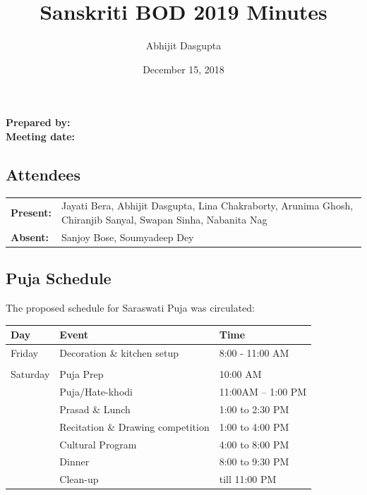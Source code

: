 \documentclass[12pt,]{article}
\title{Sanskriti BOD 2019 Minutes}
\author{Abhijit Dasgupta}
\date{December 15, 2018}
\makeatletter
\renewcommand{\maketitle}{\bgroup\setlength{\parindent}{0pt}
\begin{flushleft}
  \textbf{Prepared by:} \@author\\
  \textbf{Meeting date:} \@date
\end{flushleft}\egroup
}
\makeatother
\begin{document}
\maketitle

\thispagestyle{style1}

{
\setcounter{tocdepth}{4}
\tableofcontents
}
\hypertarget{attendees}{%
\subsection{Attendees}\label{attendees}}

\begin{longtable}[]{@{}ll@{}}
\toprule
\endhead
\begin{minipage}[t]{0.09\columnwidth}\raggedright
\textbf{Present:}\strut
\end{minipage} & \begin{minipage}[t]{0.85\columnwidth}\raggedright
Jayati Bera, Abhijit Dasgupta, Lina Chakraborty, Arunima Ghosh,
Chiranjib Sanyal, Swapan Sinha, Nabanita Nag\strut
\end{minipage}\tabularnewline
\begin{minipage}[t]{0.09\columnwidth}\raggedright
\textbf{Absent:}\strut
\end{minipage} & \begin{minipage}[t]{0.85\columnwidth}\raggedright
Sanjoy Bose, Soumyadeep Dey\strut
\end{minipage}\tabularnewline
\bottomrule
\end{longtable}

\newpage

\hypertarget{puja-schedule}{%
\subsection{Puja Schedule}\label{puja-schedule}}

The proposed schedule for Saraswati Puja was circulated:

\begin{longtable}[]{@{}lll@{}}
\toprule
Day & Event & Time\tabularnewline
\midrule
\endhead
Friday & Decoration \& kitchen setup & 8:00 - 11:00 AM\tabularnewline
& &\tabularnewline
Saturday & Puja Prep & 10:00 AM\tabularnewline
& Puja/Hate-khodi & 11:00AM -- 1:00 PM\tabularnewline
& Prasad \& Lunch & 1:00 to 2:30 PM\tabularnewline
& Recitation \& Drawing competition & 1:00 to 4:00 PM\tabularnewline
& Cultural Program & 4:00 to 8:00 PM\tabularnewline
& Dinner & 8:00 to 9:30 PM\tabularnewline
& Clean-up & till 11:00 PM\tabularnewline
\bottomrule
\end{longtable}
\end{document}
